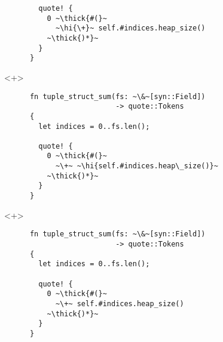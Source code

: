 \documentclass[usepdftitle=false]{beamer}
\renewcommand{\&}{\makebox[\widthof{\ampersand}][c]{\scalebox{0.9}[1.0]{\Book\ampersand}}}
\newcommand{\+}{\makebox[\widthof{+}][c]{\raisebox{-.2\height}{\scalefont{1.5}\Light+}}}
\newcommand{\thick}[1]{\contourlength{0.12pt}\contour[10]{black}{#1}}
\newcommand{\hi}[1]{%
\tikz[baseline=(A.base)]
 \node[highlighting=0,inner sep=0pt,text depth=0pt] (A) {#1};%
}
\begin{document}
\begin{frame}[fragile]
\begin{onlyenv}
\begin{verbatim}
        quote! {
          0 ~\thick{#(}~
            ~\hi{\+}~ self.#indices.heap_size()
          ~\thick{)*}~
        }
      }
    \end{verbatim}
  \end{onlyenv}
  \begin{onlyenv}<+>
    \begin{verbatim}
      fn tuple_struct_sum(fs: ~\&~[syn::Field])
                          -> quote::Tokens
      {
        let indices = 0..fs.len();

        quote! {
          0 ~\thick{#(}~
            ~\+~ ~\hi{self.#indices.heap\_size()}~
          ~\thick{)*}~
        }
      }
    \end{verbatim}
  \end{onlyenv}
  \begin{onlyenv}<+>
    \begin{verbatim}
      fn tuple_struct_sum(fs: ~\&~[syn::Field])
                          -> quote::Tokens
      {
        let indices = 0..fs.len();

        quote! {
          0 ~\thick{#(}~
            ~\+~ self.#indices.heap_size()
          ~\thick{)*}~
        }
      }
    \end{verbatim}
  \end{onlyenv}
\end{frame}
\end{document}
